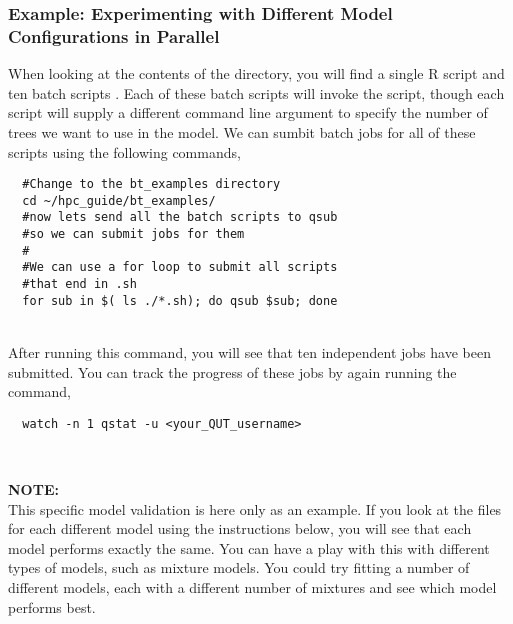 \subsubsection{Example: Experimenting with Different Model Configurations in Parallel}
%
%
When looking at the contents of the  directory, you will find a single R script  and ten batch scripts . Each of these batch scripts will invoke the  script, though each script will supply a different command line argument to specify the number of trees we want to use in the model. We can sumbit batch jobs for all of these scripts using the following commands,
\\
\par
\begin{verbatim}
  #Change to the bt_examples directory
  cd ~/hpc_guide/bt_examples/
  #now lets send all the batch scripts to qsub
  #so we can submit jobs for them
  #
  #We can use a for loop to submit all scripts
  #that end in .sh
  for sub in $( ls ./*.sh); do qsub $sub; done
\end{verbatim}
% 
\\
% 
After running this command, you will see that ten independent jobs have been submitted. You can track the progress of these jobs by again running the command,
\\
\par
\begin{verbatim}
  watch -n 1 qstat -u <your_QUT_username>
\end{verbatim}
%
\\
% 
\begin{story}
  \textbf{NOTE:}
  \\
  This specific model validation is here only as an example. If you look at the  files for each different model using the instructions below, you will see that each model performs exactly the same. You can have a play with this with different types of models, such as mixture models. You could try fitting a number of different models, each with a different number of mixtures and see which model performs best.
\end{story}

